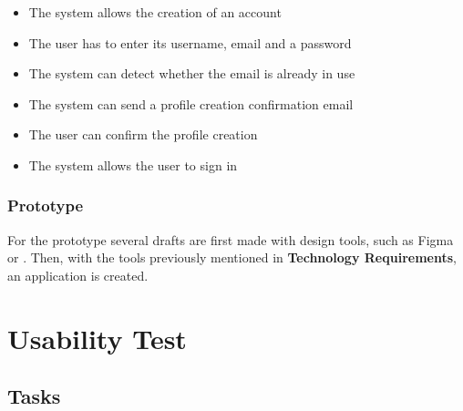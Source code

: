 \begin{itemize}
    \item The system allows the creation of an account
    \item The user has to enter its username, email and a password
    \item The system can detect whether the email is already in use
    \item The system can send a profile creation confirmation email
    \item The user can confirm the profile creation
    \item The system allows the user to sign in
\end{itemize}

\subsubsection*{Prototype}

For the prototype several drafts are first made with design tools, such as Figma or . Then,
with the tools previously mentioned in \textbf{Technology Requirements}, an application is created.

\clearpage

\section*{Usability Test}
\label{appendix:usability_tests}

\subsection*{Tasks}

